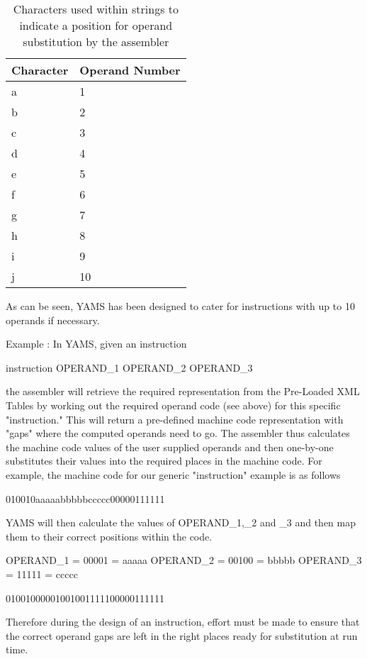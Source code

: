\begin{enumerate}
\begin{enumerate}
\begin{table}[]
\begin{center}
	\begin{tabular}{|l|l|}
	\hline
	Character	&	Operand Number \\
	\hline
	a	&	1 \\
	b	&	2 \\
	c	&	3 \\
	d	&	4 \\
	e	&	5 \\
	f	&	6 \\
	g	&	7 \\
	h	&	8 \\
	i	&	9 \\
	j	&	10 \\
	\hline
	\end{tabular}
\caption{Characters used within strings to indicate a position for operand substitution by the assembler}
\end{center}
\end{table}


As can be seen, YAMS has been designed to cater for instructions with up to 10 operands if necessary.

Example : In YAMS, given an instruction

instruction OPERAND\_1 OPERAND\_2 OPERAND\_3

the assembler will retrieve the required representation from the Pre-Loaded XML Tables by working out the required operand code (see above) for this specific "instruction." This will return a pre-defined machine code representation with "gaps" where the computed operands need to go. The assembler thus calculates the machine code values of the user supplied operands and then one-by-one substitutes their values into the required places in the machine code. For example, the machine code for our generic "instruction" example is as follows

010010aaaaabbbbbccccc00000111111

YAMS will then calculate the values of OPERAND\_1,\_2 and \_3 and then map them to their correct positions within the code.

OPERAND\_1 = 00001 = aaaaa
OPERAND\_2 = 00100 = bbbbb
OPERAND\_3 = 11111 = ccccc

01001000001001001111100000111111

Therefore during the design of an instruction, effort must be made to ensure that the correct operand gaps are left in the right places ready for substitution at run time.



\end{enumerate}
\end{enumerate}
